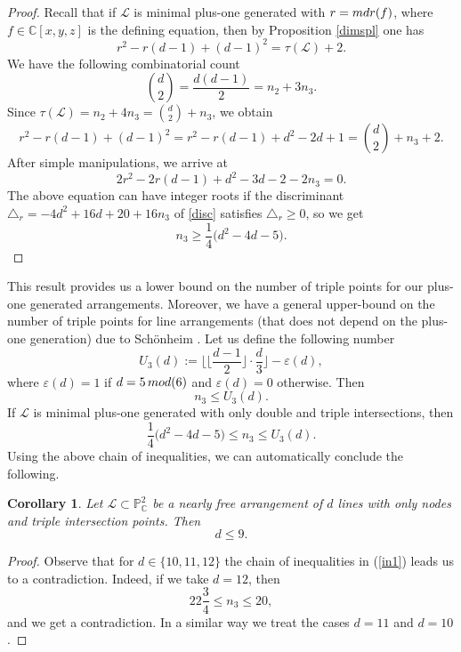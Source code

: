 \documentclass[12pt]{article}
\theoremstyle{plain}
\newtheorem{corollary}[thm]{Corollary}
\theoremstyle{definition}
\begin{document}
\begin{proof}
Recall that if $\mathcal{L}$ is minimal plus-one generated with $r = {\rm mdr}(f)$, where $f \in \mathbb{C}[x,y,z]$ is the defining equation, then by Proposition \ref{dimspl} one has
$$r^{2} - r(d-1) + (d-1)^2 = \tau(\mathcal{L})+2.$$
We have the following combinatorial count
$$\binom{d}{2} = \frac{d(d-1)}{2} = n_{2} + 3n_{3}.$$
Since 
$\tau(\mathcal{L}) = n_{2} + 4n_{3} = \binom{d}{2}+n_{3}$,
we obtain
$$r^{2} - r(d-1) + (d-1)^2 = r^{2}-r(d-1)+d^{2}-2d+1 = \binom{d}{2}+n_{3}+2.$$
After simple manipulations, we arrive at
\begin{equation}
\label{disc}
2r^{2} - 2r(d-1) + d^{2}-3d-2-2n_{3}=0.   
\end{equation}
The above equation can have integer roots if the discriminant $\triangle_{r}= -4d^2 +16d + 20 +16n_{3}$ of \eqref{disc} satisfies $\triangle_{r} \geq 0$, so we get
$$n_{3} \geq \frac{1}{4}\bigg(d^{2}-4d-5\bigg).$$
\end{proof}
This result provides us a lower bound on the number of triple points for our plus-one generated arrangements. Moreover, we have a general upper-bound on the number of triple points for line arrangements (that does not depend on the plus-one generation) due to Sch\"onheim \cite{Sch}. Let us define the following number
$$U_{3}(d) := \bigg\lfloor \bigg\lfloor \frac{d-1}{2} \bigg\rfloor \cdot \frac{d}{3} \bigg\rfloor - \varepsilon(d),$$
where $\varepsilon(d)=1$ if $d = 5 \, {\rm mod}(6)$ and $\varepsilon(d) =0$ otherwise. Then
\begin{equation}
    n_{3} \leq U_{3}(d).
\end{equation}
If $\mathcal{L}$ is minimal plus-one generated with only double and triple intersections, then
\begin{equation}
\label{in1}
\frac{1}{4}\bigg(d^{2}-4d-5\bigg) \leq n_{3} \leq U_{3}(d).
\end{equation}
Using the above chain of inequalities, we can automatically conclude the following.
\begin{corollary}
Let $\mathcal{L} \subset \mathbb{P}^{2}_{\mathbb{C}}$ be a nearly free arrangement of $d$ lines with only nodes and triple intersection points. Then
$$d \leq 9.$$
\end{corollary}
\begin{proof}
    Observe that for $d \in \{10, 11, 12\}$ the chain of inequalities in (\ref{in1}) leads us to a contradiction. Indeed, if we take $d=12$, then
    $$22\frac{3}{4} \leq n_{3} \leq 20,$$
    and we get a contradiction. In a similar way we treat the cases $d=11$ and $d=10$.
\end{proof}
\end{document}
